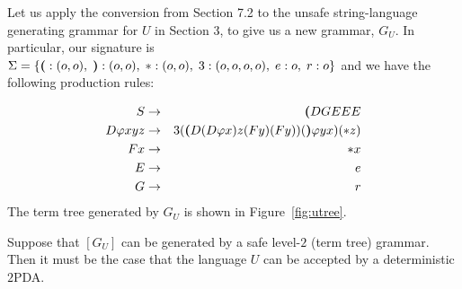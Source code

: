 Let us apply the conversion from Section 7.2 to the unsafe
string-language generating grammar for $U$ in Section 3, to give
us a new grammar, $G_{U}$. In particular, our signature is $\Sigma
= \{{\sf \textbf{(}} : (o,o), \; {\sf \textbf{)}}: (o,o), \; *: (o,o), \; 3: (o,o,o,o), \; e
: o, \; r : o\}$ and we have the following production rules:

\begin{eqnarray}
\nonumber S & \rightarrow & {\sf \textbf{(}} DGEEE \\
\nonumber D \varphi x y z & \rightarrow & 3 ({\sf \textbf{(}} D(D \varphi x) z (Fy) (Fy)) ({\sf \textbf{)}} \varphi y x) (* z)\\
\nonumber Fx & \rightarrow & \ast x \\
\nonumber E & \rightarrow & e\\
\nonumber G & \rightarrow & r
\end{eqnarray}
The term tree generated by $G_U$ is shown in
Figure~\ref{fig:utree}.

\begin{proposition}Suppose that $[G_U]$ can be
generated by a safe level-$2$ (term tree) grammar. Then it must be
the case that the language $U$ can be accepted by a deterministic
$2$PDA.
\end{proposition}

